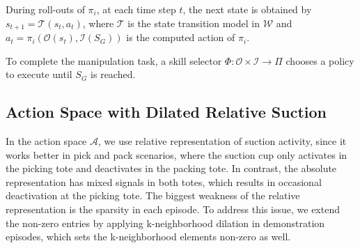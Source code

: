 During roll-outs of $\pi_i$, at each time step $t$, the next state is obtained by $s_{t+1}=\mathcal T(s_t, a_t)$, where $\mathcal{T}$ is the state transition model in $\mathcal W$ and $a_t=\pi_i(\mathcal O(s_t), \mathcal I(S_G))$ is the computed action of $\pi_i$.

To complete the manipulation task, a skill selector $\Phi:\mathcal{O}\times \mathcal{I} \rightarrow \Pi$ chooses a policy to execute until $S_G$ is reached.

\subsection{Action Space with Dilated Relative Suction}
In the action space $\mathcal A$, we use relative representation of suction activity, since it works better in pick and pack scenarios, where the suction cup only activates in the picking tote and deactivates in the packing tote. 
In contrast, the absolute representation has mixed signals in both totes, which results in 
occasional deactivation at the picking tote.
The biggest weakness of the relative representation is the sparsity in each episode\cite{team2024octo}. 
To address this issue, we extend the non-zero entries by applying k-neighborhood dilation in demonstration episodes, which sets the k-neighborhood elements non-zero as well.

